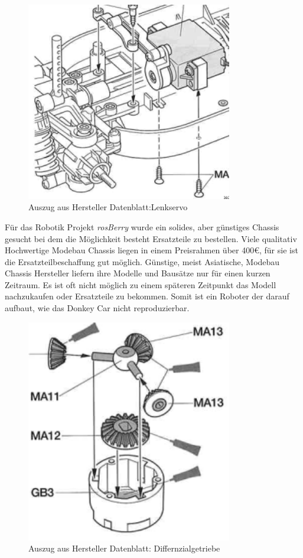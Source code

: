 \documentclass[conference]{IEEEtran}
\begin{document}
\begin{figure} %
	\centering
	\includegraphics[width=9cm]{img/Lenkung.png}
	\caption{Auszug aus Hersteller Datenblatt:Lenkservo }
	\label{Servomotor}
\end{figure}
Für das Robotik Projekt \textit{rosBerry} wurde ein solides, aber günstiges Chassis gesucht bei dem die Möglichkeit besteht Ersatzteile zu bestellen. Viele qualitativ Hochwertige Modebau Chassis liegen in einem Preisrahmen über 400€, für sie ist die Ersatzteilbeschaffung gut möglich. Günstige, meist Asiatische, Modebau Chassis Hersteller liefern ihre Modelle und Bausätze nur für einen kurzen Zeitraum. Es ist oft nicht möglich zu einem späteren Zeitpunkt das Modell nachzukaufen oder Ersatzteile zu bekommen. Somit ist ein Roboter der darauf aufbaut, wie das Donkey Car nicht reproduzierbar. 
\\
\begin{figure} %
	\centering
	\includegraphics[width=9cm]{img/differenzial.png}
	\caption{Auszug aus Hersteller Datenblatt: Differnzialgetriebe }
	\label{Getriebe}
\end{figure}
\end{document}

